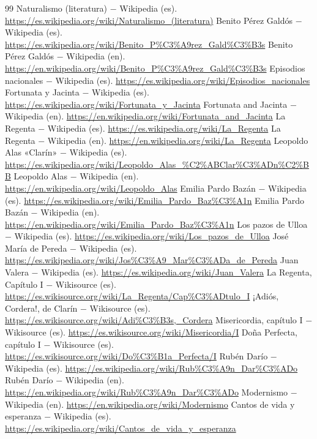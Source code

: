 \documentclass{book}
\begin{document}
\begin{thebibliography}{99}
 Naturalismo (literatura) \(-\) Wikipedia (es). \url{https://es.wikipedia.org/wiki/Naturalismo_(literatura)}
 Benito Pérez Galdós \(-\) Wikipedia (es). \url{https://es.wikipedia.org/wiki/Benito_P%C3%A9rez_Gald%C3%B3s}
 Benito Pérez Galdós \(-\) Wikipedia (en). \url{https://en.wikipedia.org/wiki/Benito_P%C3%A9rez_Gald%C3%B3s}
 Episodios nacionales \(-\) Wikipedia (es). \url{https://es.wikipedia.org/wiki/Episodios_nacionales}
 Fortunata y Jacinta \(-\) Wikipedia (es). \url{https://es.wikipedia.org/wiki/Fortunata_y_Jacinta}
 Fortunata and Jacinta \(-\) Wikipedia (en). \url{https://en.wikipedia.org/wiki/Fortunata_and_Jacinta}
 La Regenta \(-\) Wikipedia (es). \url{https://es.wikipedia.org/wiki/La_Regenta}
 La Regenta \(-\) Wikipedia (en). \url{https://en.wikipedia.org/wiki/La_Regenta}
 Leopoldo Alas «Clarín» \(-\) Wikipedia (es). \url{https://es.wikipedia.org/wiki/Leopoldo_Alas_%C2%ABClar%C3%ADn%C2%BB}
 Leopoldo Alas \(-\) Wikipedia (en). \url{https://en.wikipedia.org/wiki/Leopoldo_Alas}
 Emilia Pardo Bazán \(-\) Wikipedia (es). \url{https://es.wikipedia.org/wiki/Emilia_Pardo_Baz%C3%A1n}
 Emilia Pardo Bazán \(-\) Wikipedia (en). \url{https://en.wikipedia.org/wiki/Emilia_Pardo_Baz%C3%A1n}
 Los pazos de Ulloa \(-\) Wikipedia (es). \url{https://es.wikipedia.org/wiki/Los_pazos_de_Ulloa}
 José María de Pereda \(-\) Wikipedia (es). \url{https://es.wikipedia.org/wiki/Jos%C3%A9_Mar%C3%ADa_de_Pereda}
 Juan Valera \(-\) Wikipedia (es). \url{https://es.wikipedia.org/wiki/Juan_Valera}
 La Regenta, Capítulo I \(-\) Wikisource (es). \url{https://es.wikisource.org/wiki/La_Regenta/Cap%C3%ADtulo_I}
 ¡Adiós, Cordera!, de Clarín \(-\) Wikisource (es). \url{https://es.wikisource.org/wiki/Adi%C3%B3s,_Cordera}
 Misericordia, capítulo I \(-\) Wikisource (es). \url{https://es.wikisource.org/wiki/Misericordia/I}
 Doña Perfecta, capítulo I \(-\) Wikisource (es). \url{https://es.wikisource.org/wiki/Do%C3%B1a_Perfecta/I}
 Rubén Darío \(-\) Wikipedia (es). \url{https://es.wikipedia.org/wiki/Rub%C3%A9n_Dar%C3%ADo}
 Rubén Darío \(-\) Wikipedia (en). \url{https://en.wikipedia.org/wiki/Rub%C3%A9n_Dar%C3%ADo}
 Modernismo \(-\) Wikipedia (en). \url{https://en.wikipedia.org/wiki/Modernismo}
 Cantos de vida y esperanza \(-\) Wikipedia (es). \url{https://es.wikipedia.org/wiki/Cantos_de_vida_y_esperanza}

\end{thebibliography}
\end{document}
